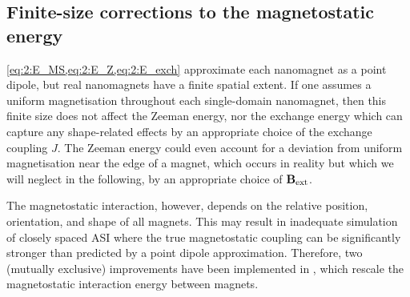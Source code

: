 \subsection{Finite-size corrections to the magnetostatic energy}\label{sec:2:finite}
\cref{eq:2:E_MS,eq:2:E_Z,eq:2:E_exch} approximate each nanomagnet as a point dipole, but real nanomagnets have a finite spatial extent.
If one assumes a uniform magnetisation throughout each single-domain nanomagnet, then this finite size does not affect the Zeeman energy, nor the exchange energy which can capture any shape-related effects by an appropriate choice of the exchange coupling $J$.
The Zeeman energy could even account for a deviation from uniform magnetisation near the edge of a magnet, which occurs in reality but which we will neglect in the following, by an appropriate choice of $\boldsymbol{\mathbf{B}}_\mathrm{ext}$. \par
The magnetostatic interaction, however, depends on the relative position, orientation, and shape of all magnets.
This may result in inadequate simulation of closely spaced ASI where the true magnetostatic coupling can be significantly stronger than predicted by a point dipole approximation.
Therefore, two (mutually exclusive) improvements have been implemented in \hotspice, which rescale the magnetostatic interaction energy between magnets.

